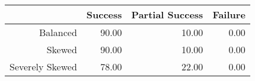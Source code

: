 \begin{table}[ht]
\centering
\begin{tabular}{rrrr}
  \hline
 & Success & Partial Success & Failure \\ 
  \hline
Balanced & 90.00 & 10.00 & 0.00 \\ 
  Skewed & 90.00 & 10.00 & 0.00 \\ 
  Severely Skewed & 78.00 & 22.00 & 0.00 \\ 
   \hline
\end{tabular}
\end{table}
